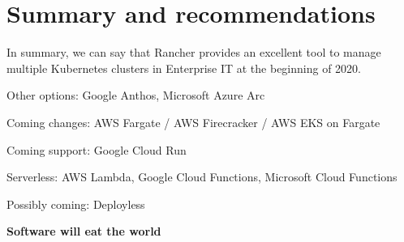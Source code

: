 %
%

\pagebreak
\section{Summary and recommendations}

\onehalfspacing

In summary, we can say that Rancher provides an excellent tool to manage multiple Kubernetes clusters in Enterprise IT at the beginning of 2020.

Other options: Google Anthos, Microsoft Azure Arc

Coming changes: AWS Fargate / AWS Firecracker / AWS EKS on Fargate

Coming support: Google Cloud Run

Serverless: AWS Lambda, Google Cloud Functions, Microsoft Cloud Functions 

Possibly coming: Deployless

\textbf{Software will eat the world}
